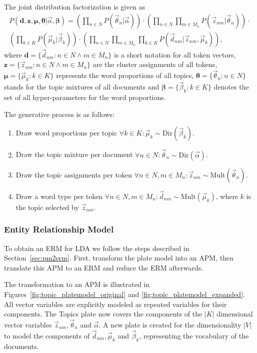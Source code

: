 The joint distribution factorization is given as
\begin{multline}
P(\boldsymbol{d},\boldsymbol{z}, \boldsymbol{\mu}, \boldsymbol{\theta} | \vec \alpha, \boldsymbol{\beta}) =
 \left(\prod_{n \in N} P(\vec \theta_n | \vec \alpha)\right) \cdot
 \left(\prod_{n \in N} \prod_{m \in M_n} P(\vec z_{nm} | \vec \theta_n)\right) \cdot \\
 \left(\prod_{k \in K} P(\vec \mu_k | \vec \beta_k)\right) \cdot
 \left(\prod_{n \in N} \prod_{m \in M_n} \prod_{k \in K}P(\vec d_{nm} | \vec z_{nm}, \vec \mu_k)\right),
\end{multline}
where $\boldsymbol{d} = \{\vec d_{nm} : n \in N \land m \in M_n \}$ is a short notation for all token vectors, $\boldsymbol{z} = \{ \vec z_{nm} : n \in N \land m \in M_n \}$ are the cluster assignments of all tokens, $\boldsymbol{\mu} = \{ \vec \mu_k : k \in K \}$ represents the word proportions of all topics, $\boldsymbol{\theta} = \{ \vec \theta_n : n \in N \}$ stands for the topic mixtures of all documents and $\boldsymbol{\beta} = \{ \vec \beta_k : k \in K \}$ denotes the set of all hyper-parameters for the word proportions.

The generative process is as follows:
\begin{enumerate}
\item Draw word proportions per topic $\forall k \in K: \vec \mu_k \sim \text{Dir}(\vec \beta_k)$.
\item Draw the topic mixture per document $\forall n \in N: \vec \theta_n \sim \text{Dir}(\vec \alpha)$.
\item Draw the topic assignments per token $\forall n \in N, m \in M_n: \vec z_{nm} \sim \text{Mult}(\vec \theta_n)$.
\item Draw a word type per token $\forall n \in N, m \in M_n: \vec d_{nm} \sim \text{Mult}(\vec \mu_k)$, where $k$ is the topic selected by $\vec z_{nm}$.
\end{enumerate}

\subsubsection{Entity Relationship Model}

To obtain an ERM for LDA we follow the steps described in Section~\ref{sec:pm2erm}. First, transform the plate model into an APM, then translate this APM to an ERM and reduce the ERM afterwards.

The transformation to an APM is illustrated in Figures~\ref{fig:topic_platemodel_original} and \ref{fig:topic_platemodel_expanded}. All vector variables are explicitly modeled as repeated variables for their components. The Topics plate now covers the components of the $|K|$ dimensional vector variables $\vec z_{nm}, \vec \theta_n$ and $\vec \alpha$. A new plate is created for the dimensionality $|V|$ to model the components of $\vec d_{nm}, \vec \mu_k$ and $\vec \beta_k$, representing the vocabulary of the documents.

